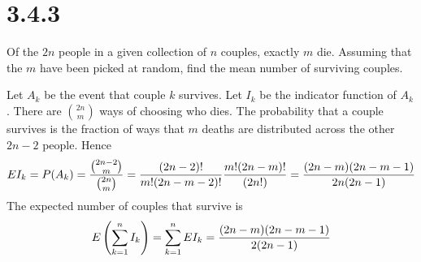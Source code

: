 \section*{3.4.3}
Of the $2n$ people in a given collection of $n$ couples,
exactly $m$ die. Assuming that the $m$ have been picked at random,
find the mean number of surviving couples.

\bigskip
\noindent
Let $A_k$ be the event that couple $k$ survives.
Let $I_k$ be the indicator function of $A_k$.
There are $2n\choose m$ ways of choosing who dies.
The probability that a couple survives is the fraction of ways that
$m$ deaths are distributed across the other $2n-2$ people.
Hence
$$EI_k=P(A_k)={{2n-2\choose m}\over{2n\choose m}}
={(2n-2)!\over m!(2n-m-2)!}{m!(2n-m)!\over(2n!)}
={(2n-m)(2n-m-1)\over2n(2n-1)}$$
The expected number of couples that survive is
$$E\left(\sum_{k=1}^nI_k\right)=\sum_{k=1}^nEI_k
={(2n-m)(2n-m-1)\over2(2n-1)}$$
